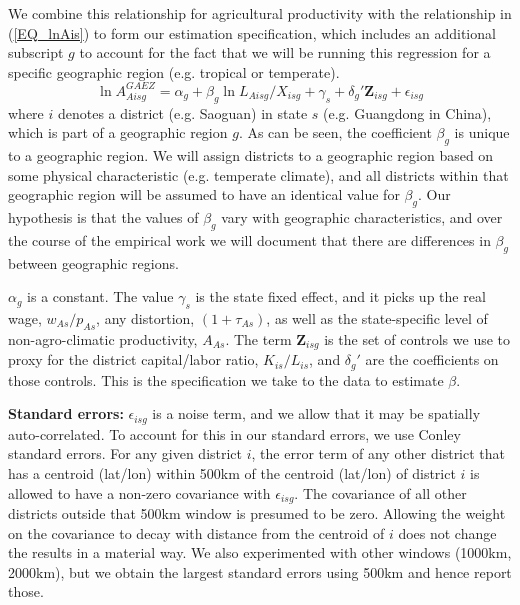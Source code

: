 \documentclass[11pt]{article}
\begin{document}
We combine this relationship for agricultural productivity with the relationship in (\ref{EQ_lnAis}) to form our estimation specification, which includes an additional subscript $g$ to account for the fact that we will be running this regression for a specific geographic region (e.g. tropical or temperate).
\begin{equation}
\ln A^{GAEZ}_{Aisg} = \alpha_g + \beta_g \ln L_{Aisg}/X_{isg} + \gamma_{s} + \delta_g' \mathbf{Z}_{isg} + \epsilon_{isg} \label{EQ_regress}
\end{equation}
where $i$ denotes a district (e.g. Saoguan) in state $s$ (e.g. Guangdong in China), which is part of a geographic region $g$. As can be seen, the coefficient $\beta_g$ is unique to a geographic region. We will assign districts to a geographic region based on some physical characteristic (e.g. temperate climate), and all districts within that geographic region will be assumed to have an identical value for $\beta_g$. Our hypothesis is that the values of $\beta_g$ vary with geographic characteristics, and over the course of the empirical work we will document that there are differences in $\beta_g$ between geographic regions.

$\alpha_g$ is a constant. The value $\gamma_s$ is the state fixed effect, and it picks up the real wage, $w_{As}/p_{As}$, any distortion, $(1+\tau_{As})$, as well as the state-specific level of non-agro-climatic productivity, $A_{As}$. The term $\mathbf{Z}_{isg}$ is the set of controls we use to proxy for the district capital/labor ratio, $K_{is}/L_{is}$, and $\delta_g'$ are the coefficients on those controls. This is the specification we take to the data to estimate $\beta$.

\vspace{.5cm}\noindent\textbf{Standard errors:} $\epsilon_{isg}$ is a noise term, and we allow that it may be spatially auto-correlated. To account for this in our standard errors, we use Conley standard errors. For any given district $i$, the error term of any other district that has a centroid (lat/lon) within 500km of the centroid (lat/lon) of district $i$ is allowed to have a non-zero covariance with $\epsilon_{isg}$. The covariance of all other districts outside that 500km window is presumed to be zero. Allowing the weight on the covariance to decay with distance from the centroid of $i$ does not change the results in a material way. We also experimented with other windows (1000km, 2000km), but we obtain the largest standard errors using 500km and hence report those.
\end{document}

